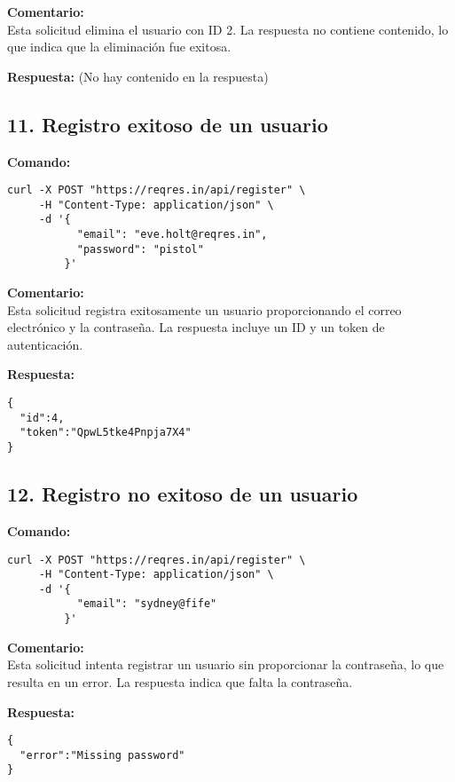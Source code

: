 \documentclass[12pt,a4paper]{article}
\begin{document}
\textbf{Comentario:}\\
Esta solicitud elimina el usuario con ID 2. La respuesta no contiene contenido, lo que indica que la eliminación fue exitosa.

\textbf{Respuesta:}
(No hay contenido en la respuesta)

\subsection{11. Registro exitoso de un usuario}
\textbf{Comando:}
\begin{samepage}
\begin{verbatim}
curl -X POST "https://reqres.in/api/register" \
     -H "Content-Type: application/json" \
     -d '{
           "email": "eve.holt@reqres.in",
           "password": "pistol"
         }'
\end{verbatim}
\end{samepage}

\textbf{Comentario:}\\
Esta solicitud registra exitosamente un usuario proporcionando el correo electrónico y la contraseña. La respuesta incluye un ID y un token de autenticación.

\textbf{Respuesta:}
\begin{samepage}
\begin{verbatim}
{
  "id":4,
  "token":"QpwL5tke4Pnpja7X4"
}
\end{verbatim}
\end{samepage}

\subsection{12. Registro no exitoso de un usuario}
\textbf{Comando:}
\Needspace{20\baselineskip}
\begin{samepage}
\begin{verbatim}
curl -X POST "https://reqres.in/api/register" \
     -H "Content-Type: application/json" \
     -d '{
           "email": "sydney@fife"
         }'
\end{verbatim}
\end{samepage}

\textbf{Comentario:}\\
Esta solicitud intenta registrar un usuario sin proporcionar la contraseña, lo que resulta en un error. La respuesta indica que falta la contraseña.

\textbf{Respuesta:}
\begin{samepage}
\begin{verbatim}
{
  "error":"Missing password"
}
\end{verbatim}
\end{samepage}
\end{document}
